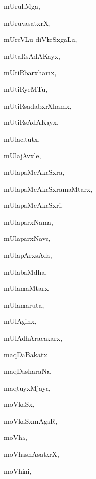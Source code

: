 \begin{multicols}{3}
{\noindent
{mUruliMga}, \pageref{mUruliMga}

\noindent
{mUruvasatxrX}, \pageref{mUruvasatxrX}

\noindent
{mUreVLu diVkeSx\-gaLu}, \pageref{mUreVLu diVkeSxgaLu}

\noindent
{mUtaRsAdAKayx}, \pageref{mUtaRsAdAKayx}

\noindent
{mUtiRbarxhamx}, \pageref{mUtiRbarxhamx}

\noindent
{mUtiRyeMTu}, \pageref{mUtiRyeMTu}

\noindent
{mUtiRsadabxrXhamx}, \pageref{mUtiRsadabxrXhamx}

\noindent
{mUtiRsAdAKayx}, \pageref{mUtiRsAdAKayx}

\noindent
{mUlacitutx}, \pageref{mUlacitutx}

\noindent
{mUlajAvxle}, \pageref{mUlajAvxle}

\noindent
{mUlapaMcAkaSxra}, \pageref{mUlapaMcAkaSxra}

\noindent
{mUlapaMcAkaSxramaMtarx}, \pageref{mUlapaMcAkaSxramaMtarx}

\noindent
{mUlapaMcAkaSxri}, \pageref{mUlapaMcAkaSxri}

\noindent
{mUlaparxNama}, \pageref{mUlaparxNama}

\noindent
{mUlaparxNava}, \pageref{mUlaparxNava}

\noindent
{mUlapArxsAda}, \pageref{mUlapArxsAda}

\noindent
{mUlabaMdha}, \pageref{mUlabaMdha}

\noindent
{mUlamaMtarx}, \pageref{mUlamaMtarx}

\noindent
{mUlamaruta}, \pageref{mUlamaruta}

\noindent
{mUlAginx}, \pageref{mUlAginx}

\noindent
{mUlAdhAracakarx}, \pageref{mUlAdhAracakarx}

\noindent
{maqDaBakatx}, \pageref{maqDaBakatx}

\noindent
{maqDasharaNa}, \pageref{maqDasharaNa}

\noindent
{maqtuyxMjaya}, \pageref{maqtuyxMjaya}

\noindent
{moVkaSx}, \pageref{moVkaSx}

\noindent
{moVkaSxmAgaR}, \pageref{moVkaSxmAgaR}

\noindent
{moVha}, \pageref{moVha}

\noindent
{moVhashAsatxrX}, \pageref{moVhashAsatxrX}

\noindent
{moVhini}, \pageref{moVhini}

}
\end{multicols}
